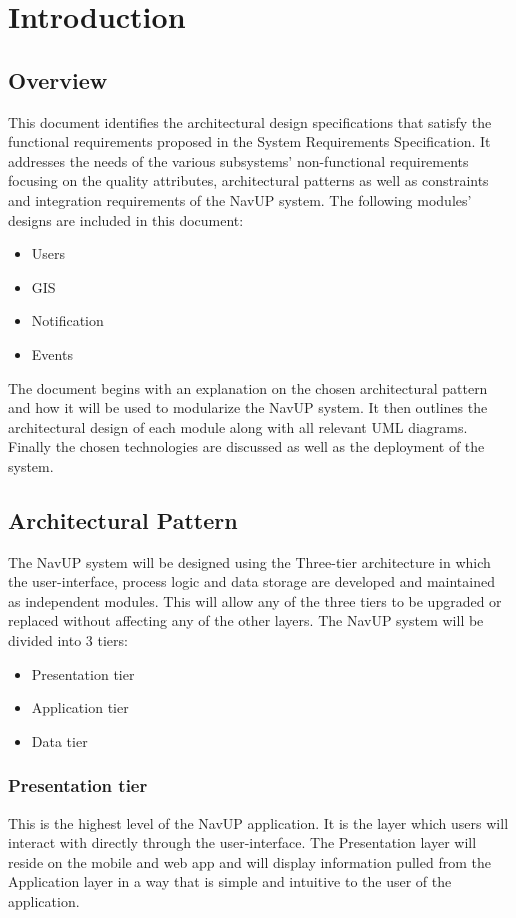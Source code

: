 \section{Introduction}
\subsection{Overview}
This document identifies the architectural design specifications that satisfy the functional requirements proposed in the System Requirements Specification. It addresses the needs of the various subsystems' non-functional requirements focusing on the quality attributes, architectural patterns as well as constraints and integration requirements of the NavUP system.\newline \newline 
The following modules' designs are included in this document:
\begin{itemize}
	\item Users
	\item GIS
	\item Notification
	\item Events
\end{itemize}
The document begins with an explanation on the chosen architectural pattern and how it will be used to modularize the NavUP system. It then outlines the architectural design of each module along with all relevant UML diagrams. Finally the chosen technologies are discussed as well as the deployment of the system. 

\subsection{Architectural Pattern}
The NavUP system will be designed using the Three-tier architecture in which the user-interface, process logic and data storage are developed and maintained as independent modules. This will allow any of the three tiers to be upgraded or replaced without affecting any of the other layers. \newline
The NavUP system will be divided into 3 tiers:
\begin{itemize}
	\item Presentation tier
	\item Application tier
	\item Data tier
\end{itemize} 

\subsubsection{Presentation tier}
This is the highest level of the NavUP application. It is the layer which users will interact with directly through the user-interface. The Presentation layer will reside on the mobile and web app and will display information pulled from the Application layer in a way that is simple and intuitive to the user of the application.

